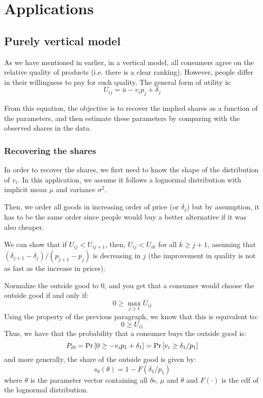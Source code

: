 \section{Applications}

\subsection{Purely vertical model}

As we have mentioned in earlier, in a vertical model, all consumers agree on the relative quality of products (i.e. there is a clear ranking). However, people differ in their willingness to pay for such quality. The general form of utility is: $$U_{ij} = \bar u - v_i p_j + \delta_j $$

From this equation, the objective is to recover the implied shares as a function of the parameters, and then estimate these parameters by comparing with the observed shares in the data.

\subsubsection{Recovering the shares}

In order to recover the shares, we first need to know the shape of the distribution of $v_i$. In this application, we assume it follows a lognormal distribution with implicit mean $\mu$ and variance $\sigma^2$. 

Then, we order all goods in increasing order of price (or $\delta_j$) but by assumption, it has to be the same order since people would buy a better alternative if it was also cheaper.

We can show that if $U_{ij} < U_{ij+1}$, then, $U_{ij} < U_{ik}$ for all $k \geq j+1$, assuming that $(\delta_{j+1} - \delta_j)/(p_{j+1} - p_j)$ is decreasing in $j$ (the improvement in quality is not as fast as the increase in prices).

Normalize the outside good to 0, and you get that a consumer would choose the outside good if and only if: $$ 0 \geq \max_{j\geq 1} U_{ij} $$ Using the property of the previous paragraph, we know that this is equivalent to: $$ 0 \geq U_{i1} $$ Thus, we have that the probability that a consumer buys the outside good is: $$ P_{i0} = \operatorname{Pr}\left[0 \geq -v_ip_1 + \delta_1\right] = \operatorname{Pr}\left[v_i \geq \delta_1/p_1\right] $$ and more generally, the share of the outside good is given by: $$ s_0(\theta) = 1 - F(\delta_1/p_1) $$ where $\theta$ is the parameter vector containing all $\delta$s, $\mu$ and $\theta$ and $F(\cdot)$ is the cdf of the lognormal distribution.


